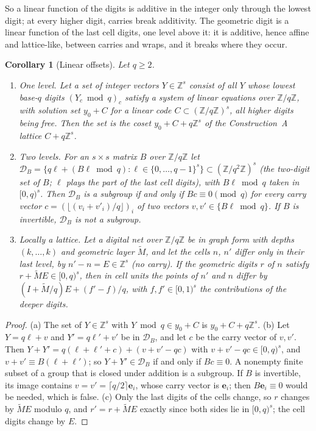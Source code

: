 \documentclass[11pt]{amsart}
\newtheorem{corollary}[theorem]{Corollary}
\theoremstyle{definition}
\theoremstyle{plain}
\newcommand{\Z}{\mathbb{Z}}
\newcommand{\e}{\mathbf{e}}
\begin{document}
So a linear function of the digits is additive in the integer only through the lowest digit; at every higher digit, carries break additivity. The geometric digit is a linear function of the last cell digits, one level above it: it is additive, hence affine and lattice-like, between carries and wraps, and it breaks where they occur.

\begin{corollary}[Linear offsets]\label{cor:linoff}
Let $q\ge2$.
\begin{enumerate}
\item[(a)] \emph{One level.} Let a set of integer vectors $Y\in\Z^s$ consist of all $Y$ whose lowest base-$q$ digits $(Y_c\bmod q)_c$ satisfy a system of linear equations over $\Z/q\Z$, with solution set $y_0+C$ for a linear code $C\subset(\Z/q\Z)^s$, all higher digits being free. Then the set is the coset $y_0+C+q\Z^s$ of the Construction~A lattice $C+q\Z^s$.
\item[(b)] \emph{Two levels.} For an $s\times s$ matrix $B$ over $\Z/q\Z$ let $\mathcal D_B=\{q\ell+(B\ell\bmod q):\ell\in\{0,\dots,q-1\}^s\}\subset(\Z/q^2\Z)^s$ (the \emph{two-digit set} of $B$; $\ell$ plays the part of the last cell digits), with $B\ell\bmod q$ taken in $[0,q)^s$. Then $\mathcal D_B$ is a subgroup if and only if $Bc\equiv0\pmod q$ for every carry vector $c=(\lfloor(v_i+v'_i)/q\rfloor)_i$ of two vectors $v,v'\in\{B\ell\bmod q\}$. If $B$ is invertible, $\mathcal D_B$ is not a subgroup.
\item[(c)] \emph{Locally a lattice.} Let a digital net over $\Z/q\Z$ be in graph form with depths $(k,\dots,k)$ and geometric layer $\tilde M$, and let the cells $n$, $n'$ differ only in their last level, by $n'-n=E\in\Z^s$ (no carry). If the geometric digits $r$ of $n$ satisfy $r+\tilde ME\in[0,q)^s$, then in cell units the points of $n'$ and $n$ differ by $(I+\tilde M/q)E+(f'-f)/q$, with $f,f'\in[0,1)^s$ the contributions of the deeper digits.
\end{enumerate}
\end{corollary}

\begin{proof}
(a) The set of $Y\in\Z^s$ with $Y\bmod q\in y_0+C$ is $y_0+C+q\Z^s$. (b) Let $Y=q\ell+v$ and $Y'=q\ell'+v'$ be in $\mathcal D_B$, and let $c$ be the carry vector of $v,v'$. Then $Y+Y'=q(\ell+\ell'+c)+(v+v'-qc)$ with $v+v'-qc\in[0,q)^s$, and $v+v'\equiv B(\ell+\ell')$; so $Y+Y'\in\mathcal D_B$ if and only if $Bc\equiv0$. A nonempty finite subset of a group that is closed under addition is a subgroup. If $B$ is invertible, its image contains $v=v'=\lceil q/2\rceil\e_i$, whose carry vector is $\e_i$; then $B\e_i\equiv0$ would be needed, which is false. (c) Only the last digits of the cells change, so $r$ changes by $\tilde ME$ modulo $q$, and $r'=r+\tilde ME$ exactly since both sides lie in $[0,q)^s$; the cell digits change by $E$.
\end{proof}
\end{document}
